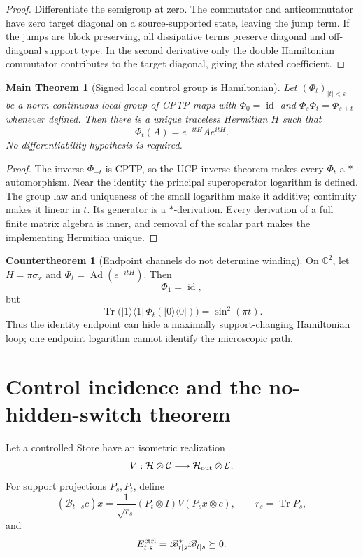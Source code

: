 \documentclass[11pt,oneside,openany]{book}
\numberwithin{equation}{chapter}
\newtheorem{maintheorem}[theorem]{Main Theorem}
\theoremstyle{definition}
\newtheorem{countertheorem}[theorem]{Countertheorem}
\theoremstyle{remark}
\newcommand{\C}{\mathbb C}
\newcommand{\Tr}{\operatorname{Tr}}
\newcommand{\Ad}{\operatorname{Ad}}
\newcommand{\id}{\operatorname{id}}
\begin{document}
\begin{proof}
Differentiate the semigroup at zero.  The commutator and anticommutator have
zero target diagonal on a source-supported state, leaving the jump term.  If
the jumps are block preserving, all dissipative terms preserve diagonal and
off-diagonal support type.  In the second derivative only the double
Hamiltonian commutator contributes to the target diagonal, giving the stated
coefficient.
\end{proof}

\begin{maintheorem}[Signed local control group is Hamiltonian]
\label{thm:v6-local-group-hamiltonian}
Let \((\Phi_t)_{|t|<\varepsilon}\) be a norm-continuous local group of CPTP
maps with \(\Phi_0=\id\) and \(\Phi_s\Phi_t=\Phi_{s+t}\) whenever defined.
Then there is a unique traceless Hermitian \(H\) such that
\[
 \boxed{\Phi_t(A)=e^{-itH}Ae^{itH}.}
\]
No differentiability hypothesis is required.
\end{maintheorem}

\begin{proof}
The inverse \(\Phi_{-t}\) is CPTP, so the UCP inverse theorem makes every
\(\Phi_t\) a \(*\)-automorphism.  Near the identity the principal
superoperator logarithm is defined.  The group law and uniqueness of the
small logarithm make it additive; continuity makes it linear in \(t\).  Its
generator is a \(*\)-derivation.  Every derivation of a full finite matrix
algebra is inner, and removal of the scalar part makes the implementing
Hermitian unique.
\end{proof}

\begin{countertheorem}[Endpoint channels do not determine winding]
\label{cth:v6-winding}
On \(\C^2\), let \(H=\pi\sigma_x\) and
\(\Phi_t=\Ad(e^{-itH})\).  Then
\[
 \Phi_1=\id,
\]
but
\[
 \Tr\bigl(|1\rangle\langle1|\,
 \Phi_t(|0\rangle\langle0|)\bigr)=\sin^2(\pi t).
\]
Thus the identity endpoint can hide a maximally support-changing Hamiltonian
loop; one endpoint logarithm cannot identify the microscopic path.
\end{countertheorem}

\section{Control incidence and the no-hidden-switch theorem}

Let a controlled Store have an isometric realization
\[
 V:\mathcal H\otimes\mathcal C
 \longrightarrow\mathcal H_{\rm out}\otimes\mathcal E.
\]
For support projections \(P_s,P_t\), define
\[
 (\mathscr B_{t\mid s}c)x
 =\frac{1}{\sqrt{r_s}}(P_t\otimes I)V(P_sx\otimes c),
 \qquad r_s=\Tr P_s,
\]
and
\[
 E_{t\mid s}^{\rm ctrl}=\mathscr B_{t\mid s}^*
 \mathscr B_{t\mid s}\succeq0.
\]
\end{document}

